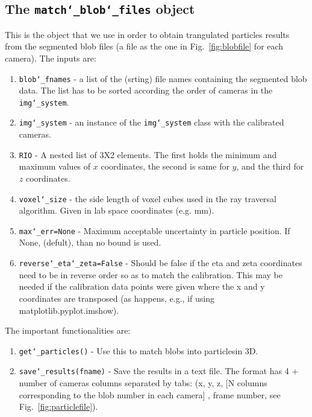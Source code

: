 \documentclass[10pt,a4paper]{article}
\begin{document}
\subsection{The \texttt{match\char`_blob\char`_files} object}


This is the object that we use in order to obtain trangulated particles results from the segmented blob files (a file as the one in Fig.~\ref{fig:blobfile} for each camera). The inputs are:
%
\begin{enumerate}
	\item \texttt{blob\char`_fnames} - a list of the (srting) file names containing the segmented blob data. The list has to be sorted according the order of cameras in the \texttt{img\char`_system}.
	\item \texttt{img\char`_system} - an instance of the \texttt{img\char`_system} class with the calibrated cameras.
	\item \texttt{RIO} - A nested list of 3X2 elements. The first holds the minimum and  maximum values of $x$ coordinates, the second is same for $y$, and  the third for $z$ coordinates. 
	\item \texttt{voxel\char`_size} - the side length of voxel cubes used in the ray traversal algorithm. Given in lab space coordinates (e.g. mm).
	\item \texttt{max\char`_err=None} - Maximum acceptable uncertainty in particle position. If None, (defult), than no bound is used.
	\item \texttt{reverse\char`_eta\char`_zeta=False} - Should be false if the eta and zeta coordinates need to be in reverse order so as to match the calibration. This may be needed if the calibration data points were given where the x and y coordinates are transposed (as happens, e.g., if using matplotlib.pyplot.imshow).
\end{enumerate}


The important functionalities are:
%
\begin{enumerate}
	\item \texttt{get\char`_particles()} - Use this to match blobs into particlesin 3D.
	\item \texttt{save\char`_results(fname)} - Save the results in a text file. The format has 4 + number of cameras columns separated by tabs:
	(x, y, z, [N columns corresponding to the blob number in each camera] , frame number, see Fig.~\ref{fig:particlefile}).
\end{enumerate}
\end{document}
